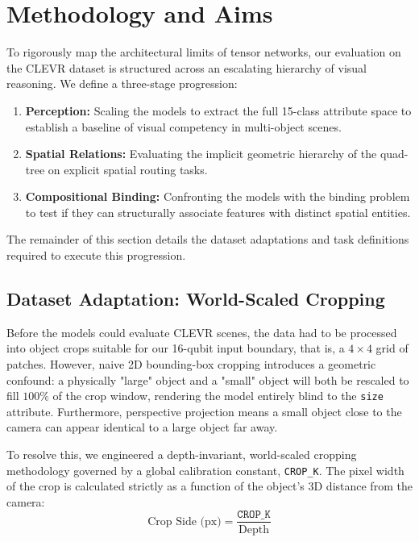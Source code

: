 \documentclass[12pt, a4paper, oneside]{report}
\begin{document}
\section{Methodology and Aims}
To rigorously map the architectural limits of tensor networks, our evaluation on the CLEVR dataset is structured across an escalating hierarchy of visual reasoning. We define a three-stage progression:
\begin{enumerate}
    \item \textbf{Perception:} Scaling the models to extract the full 15-class attribute space to establish a baseline of visual competency in multi-object scenes.
    \item \textbf{Spatial Relations:} Evaluating the implicit geometric hierarchy of the quad-tree on explicit spatial routing tasks.
    \item \textbf{Compositional Binding:} Confronting the models with the binding problem \cite{greff2020binding} to test if they can structurally associate features with distinct spatial entities.
\end{enumerate}

The remainder of this section details the dataset adaptations and task definitions required to execute this progression.

\subsection{Dataset Adaptation: World-Scaled Cropping}
Before the models could evaluate CLEVR scenes, the data had to be processed into object crops suitable for our 16-qubit input boundary, that is, a $4 \times 4$ grid of patches. However, naive 2D bounding-box cropping introduces a geometric confound: a physically "large" object and a "small" object will both be rescaled to fill $100\%$ of the crop window, rendering the model entirely blind to the \texttt{size} attribute. Furthermore, perspective projection means a small object close to the camera can appear identical to a large object far away.

To resolve this, we engineered a depth-invariant, world-scaled cropping methodology governed by a global calibration constant, \texttt{CROP\_K}. The pixel width of the crop is calculated strictly as a function of the object's 3D distance from the camera:
\begin{equation}
    \text{Crop Side (px)} = \frac{\texttt{CROP\_K}}{\text{Depth}}
\end{equation}
\end{document}
